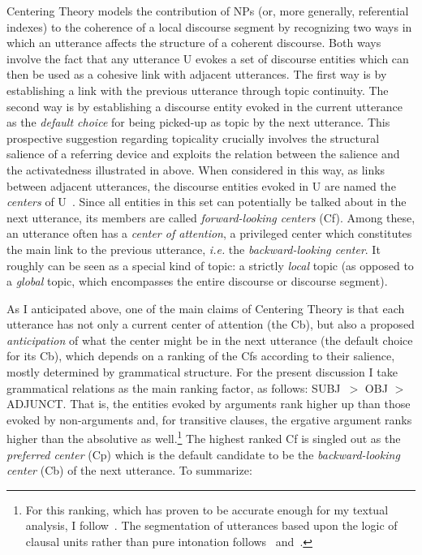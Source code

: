 \documentclass[output=paper
,modfonts
,nonflat]{langsci/langscibook}
\begin{document}
Centering Theory models the contribution of NPs (or, more generally, referential indexes) to the coherence of a local discourse segment by recognizing two ways in which an utterance affects the structure of a coherent discourse. Both ways involve the fact that any utterance U evokes a set of discourse entities which can then be used as a cohesive link with adjacent utterances. The first way is by establishing a link with the previous utterance through topic continuity. The second way is by establishing a discourse entity evoked in the current utterance as the \textit{default choice} for being picked-up as topic by the next utterance. This prospective suggestion regarding topicality crucially involves the structural salience of a referring device and exploits the relation between the salience and the activatedness illustrated in  above. When considered in this way, as links between adjacent utterances, the discourse entities evoked in U are named the \textit{centers} of U~\citep[208]{GroszEtAlii1995}. Since all entities in this set can potentially be talked about in the next utterance, its members are called \textit{forward-looking centers} (Cf). Among these, an utterance often has a \textit{center of attention}, a privileged center which constitutes the main link to the previous utterance, \textit{i.e.} the \textit{backward-looking center}. It roughly can be seen as a special kind of topic: a strictly \textit{local} topic (as opposed to a \textit{global} topic, which encompasses the entire discourse or discourse segment). 

As I anticipated above, one of the main claims of Centering Theory is that each utterance has not only a current center of attention (the Cb), but also a proposed \textit{anticipation} of what the center might be in the next utterance (the default choice for its Cb), which depends on a ranking of the Cfs according to their salience, mostly determined by grammatical structure. For the present discussion I take grammatical relations as the main ranking factor, as follows: SUBJ~$>$ OBJ $>$ ADJUNCT. That is, the entities evoked by arguments rank higher up than those evoked by non-arguments and, for transitive clauses, the ergative argument ranks higher than the absolutive as well.\footnote{For this ranking, which has proven to be accurate enough for my textual analysis, I follow~\citet[1837-1838]{Hedberg2010}. The segmentation of utterances based upon the logic of clausal units rather than pure intonation follows~\citet{Prince1999} and~\citet{Kibrik2011}.}
The highest ranked Cf is singled out as the \textit{preferred center} (Cp) which is the default candidate to be the \textit{backward-looking center} (Cb) of the next utterance. To summarize: 
\end{document}
